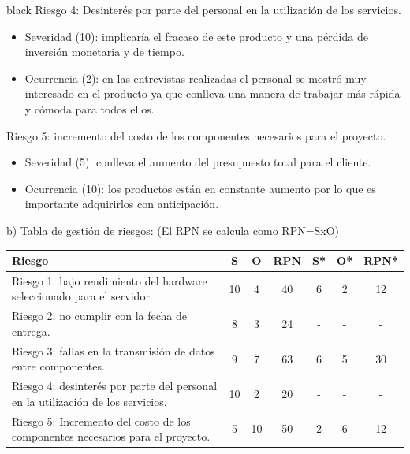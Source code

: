 \documentclass[11pt]{charter}
\begin{document}
\begin{consigna}{black}
Riesgo 4: Desinterés por parte del personal en la utilización de los servicios.
\begin{itemize}
\item Severidad (10): implicaría el fracaso de este producto y una pérdida de inversión monetaria y de tiempo.
\item Ocurrencia (2): en las entrevistas realizadas el personal se mostró muy interesado en el producto ya que conlleva una manera de trabajar más rápida y cómoda para todos ellos.
\end{itemize}

Riesgo 5: incremento del costo de los componentes necesarios para el proyecto.
\begin{itemize}
\item Severidad (5): conlleva el aumento del presupuesto total para el cliente.
\item Ocurrencia (10): los productos están en constante aumento por lo que es importante adquirirlos con anticipación.
\end{itemize}


b) Tabla de gestión de riesgos:      (El RPN se calcula como RPN=SxO)
\begin{table}[htpb]
\centering
\begin{tabularx}{\linewidth}{@{}|X|c|c|c|c|c|c|@{}}
\hline
\rowcolor[HTML]{C0C0C0} 
Riesgo & S & O & RPN & S* & O* & RPN* \\ \hline
 Riesgo 1: bajo rendimiento del hardware seleccionado para el servidor. &10   &4   &40     &6    &2    &12      \\ \hline
 Riesgo 2: no cumplir con la fecha de entrega.  &8   &3   &24     &-    & -   & -     \\ \hline
 Riesgo 3: fallas en la transmisión de datos entre componentes. &9   &7   & 63    &6    &5    &30      \\ \hline
  Riesgo 4: desinterés por parte del personal en la utilización de los servicios.&10   &2   &20     &-    &  -  & -     \\ \hline
   Riesgo 5: Incremento del costo de los componentes necesarios para el proyecto. &5   &10   &50     &2    &6    &12      \\ \hline
\end{tabularx}
\end{table}

\end{consigna}
\end{document}
